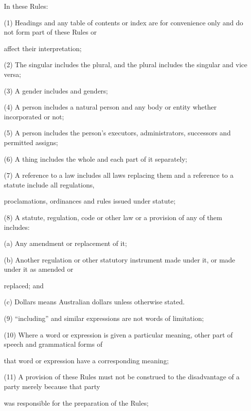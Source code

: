 \documentclass{article}
\begin{document}
{\fontsize{10.02}{1}In these Rules: }

{\fontsize{9.962}{1}(1) Headings and any table of contents or index are for convenience only and do not form part of these Rules or }

{\fontsize{10.02}{1}affect their interpretation; }

{\fontsize{9.962}{1}(2) The singular includes the plural, and the plural includes the singular and vice versa; }

{\fontsize{9.962}{1}(3) A gender includes and genders; }

{\fontsize{9.962}{1}(4) A person includes a natural person and any body or entity whether incorporated or not; }

{\fontsize{9.962}{1}(5) A person includes the person’s executors, administrators, successors and permitted assigns; }

{\fontsize{9.962}{1}(6) A thing includes the whole and each part of it separately; }

{\fontsize{9.962}{1}(7) A reference to a law includes all laws replacing them and a reference to a statute include all regulations, }

{\fontsize{10.02}{1}proclamations, ordinances and rules issued under statute; }

{\fontsize{9.962}{1}(8) A statute, regulation, code or other law or a provision of any of them includes: }

{\fontsize{9.962}{1}(a) Any amendment or replacement of it; }

{\fontsize{9.962}{1}(b) Another regulation or other statutory instrument made under it, or made under it as amended or }

{\fontsize{10.02}{1}replaced; and }

{\fontsize{9.962}{1}(c) Dollars means Australian dollars unless otherwise stated. }

{\fontsize{9.962}{1}(9) “including” and similar expressions are not words of limitation; }

{\fontsize{9.962}{1}(10) Where a word or expression is given a particular meaning, other part of speech and grammatical forms of }

{\fontsize{10.02}{1}that word or expression have a corresponding meaning; }

{\fontsize{9.962}{1}(11) A provision of these Rules must not be construed to the disadvantage of a party merely because that party }

{\fontsize{10.02}{1}was responsible for the preparation of the Rules; }
\end{document}
